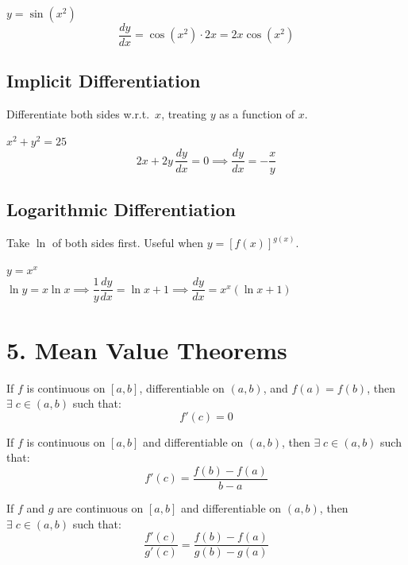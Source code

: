 \documentclass[12pt]{article}
\begin{document}
\begin{examplebox*}
$y = \sin(x^2)$
\[
  \frac{dy}{dx} = \cos(x^2)\cdot 2x = 2x\cos(x^2)
\]
\end{examplebox*}

\subsection{Implicit Differentiation}

Differentiate both sides w.r.t.\ $x$, treating $y$ as a function of $x$.

\begin{examplebox*}
$x^2 + y^2 = 25$
\[
  2x + 2y\,\frac{dy}{dx} = 0 \implies \frac{dy}{dx} = -\frac{x}{y}
\]
\end{examplebox*}

\subsection{Logarithmic Differentiation}

Take $\ln$ of both sides first. Useful when $y = [f(x)]^{g(x)}$.

\begin{examplebox*}
$y = x^x$\\[4pt]
$\ln y = x\ln x \implies \dfrac{1}{y}\dfrac{dy}{dx} = \ln x + 1 \implies \dfrac{dy}{dx} = x^x(\ln x + 1)$
\end{examplebox*}

\section{5. Mean Value Theorems}

\begin{thmbox}
If $f$ is continuous on $[a,b]$, differentiable on $(a,b)$, and $f(a) = f(b)$, then $\exists\; c \in (a,b)$ such that:
\[
  f'(c) = 0
\]
\end{thmbox}

\begin{thmbox}
If $f$ is continuous on $[a,b]$ and differentiable on $(a,b)$, then $\exists\; c \in (a,b)$ such that:
\[
  f'(c) = \frac{f(b) - f(a)}{b - a}
\]
\end{thmbox}

\begin{thmbox}
If $f$ and $g$ are continuous on $[a,b]$ and differentiable on $(a,b)$, then $\exists\; c \in (a,b)$ such that:
\[
  \frac{f'(c)}{g'(c)} = \frac{f(b) - f(a)}{g(b) - g(a)}
\]
\end{thmbox}
\end{document}
